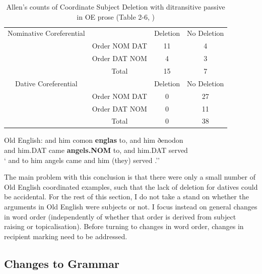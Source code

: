 	\begin{table}[t]
		\begin{tabular}{cccc}
			Nominative Coreferential & & Deletion & No Deletion \\
			& Order NOM DAT & 11 & 4 \\
			& Order DAT NOM & 4 & 3 \\
			& Total & 15 & 7 \\
			\hline
			Dative Coreferential & & Deletion & No Deletion \\
			& Order NOM DAT & 0 & 27 \\
			& Order DAT NOM & 0 & 11 \\
			& Total & 0 & 38 \\
		\end{tabular}
		\caption{Allen's counts of Coordinate Subject Deletion with ditransitive passive in OE prose (Table 2-6, \citealt{Allen.1999})}
		\label{tab:AllenOECSD}
	\end{table}

	\begin{exe}
		\ex \label{ex:OECSD} Old English:
		\gll and him comon \textbf{englas} to, and him ðenodon\\
		and him.DAT came \textbf{angels.NOM} to, and him.DAT served\\
		\trans ` and to him angels came and him (they) served \citep[ex. 34]{Allen.1999}.''
	\end{exe}

	The main problem with this conclusion is that there were only a small number of Old English coordinated examples, such that the lack of deletion for datives could be accidental. For the rest of this section, I do not take a stand on whether the arguments in Old English were subjects or not. I focus instead on general changes in word order (independently of whether that order is derived from subject raising or topicalisation). Before turning to changes in word order, changes in recipient marking need to be addressed.

	\subsection{Changes to Grammar}

